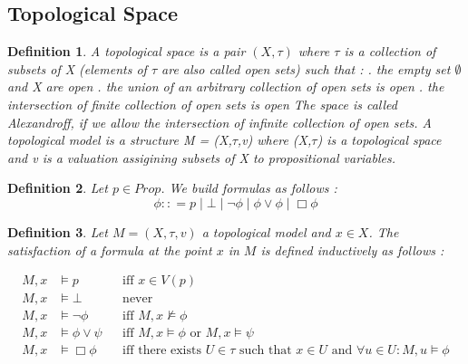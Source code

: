 \documentclass[12pt, a4paper]{scrartcl}
\newtheorem{definition}{Definition}[subsection]
\begin{document}
\subsection{Topological Space}

\begin{definition}
    A topological space is a pair $(X, \tau)$ where $\tau$ is a collection of subsets of X (elements of $\tau$ are also called open sets) such that : 
    \newline
    . the empty set $\emptyset $ and X are open
    . the union of an arbitrary collection of open sets is open
    . the intersection of finite collection of open sets is open
    \newline
    \newline
    The space is called Alexandroff, if we allow the intersection of infinite collection of open sets.
    A topological model is a structure M = (X,$\tau$,v) where (X,$\tau$) is a topological space
    and v is a valuation assigining subsets of X to propositional variables. 
        
\end{definition}

\begin{definition}
    Let $p \in Prop$. We build formulas as follows :
    $$\phi :: = p \mid \bot \mid \neg \phi \mid \phi \lor \phi \mid \Box \phi$$
\end{definition}


\begin{definition}
    Let $M = (X,\tau,v)$ a topological model and $x \in X$. The satisfaction of a formula
    at the point $x$ in $M$ is defined inductively as follows :
        
\begin{align*}
    M, x &\vDash p &&\text{iff } x \in V(p) \\
    M, x &\vDash \bot &&\text{never} \\
    M, x &\vDash \neg \phi &&\text{iff } M, x \nvDash \phi \\
    M, x &\vDash \phi \lor \psi &&\text{iff } M, x \vDash \phi \text{ or } M, x \vDash \psi \\
    M, x &\vDash \Box \phi &&\text{iff there exists } U \in \tau \text{ such that } x \in U \text{ and } \forall u \in U: M, u \vDash \phi
\end{align*}
\end{definition}
\end{document}
